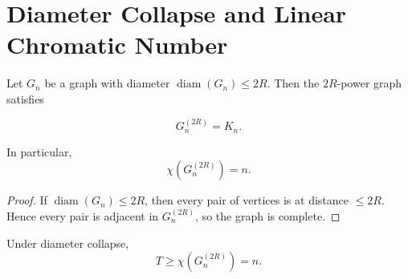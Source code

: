 \section{Diameter Collapse and Linear Chromatic Number}

\begin{theorem}
Let $G_n$ be a graph with diameter $\operatorname{diam}(G_n) \le 2R$.
Then the $2R$-power graph satisfies

\[
G_n^{(2R)} = K_n.
\]

In particular,
\[
\chi(G_n^{(2R)}) = n.
\]
\end{theorem}

\begin{proof}
If $\operatorname{diam}(G_n) \le 2R$, then every pair of vertices is at distance
$\le 2R$. Hence every pair is adjacent in $G_n^{(2R)}$, so the graph is complete.
\end{proof}

\begin{corollary}
Under diameter collapse,
\[
T \ge \chi(G_n^{(2R)}) = n.
\]
\end{corollary}
